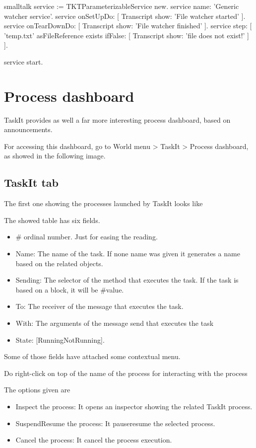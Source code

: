 \documentclass[10pt,twoside,english]{_support/latex/sbabook/sbabook}
\begin{document}
\begin{displaycode}{smalltalk}
service := TKTParameterizableService new.
service name: 'Generic watcher service'.
service onSetUpDo: [ Transcript show: 'File watcher started' ].
service onTearDownDo: [ Transcript show: 'File watcher finished' ].
service step: [
  'temp.txt' asFileReference exists
    ifFalse: [ Transcript show: 'file does not exist!' ] ].

service start.
\end{displaycode}
\chapter{Process dashboard }
TaskIt provides as well a far more interesting process dashboard, based on announcements. 

For accessing this dashboard, go to World menu \textgreater{} TaskIt \textgreater{} Process dashboard, as showed in the following image. 
\section{TaskIt tab }
The first one showing the processes launched by TaskIt looks like 

The showed table has six fields. 

\begin{itemize}
\item \# ordinal number. Just for easing the reading.
\item Name: The name of the task. If none name was given it generates a name based on the related objects. 
\item Sending: The selector of the method that executes the task. If the task is based on a block, it will be \#value. 
\item To: The receiver of the message that executes the task. 
\item With: The arguments of the message send that executes the task
\item State: {[}Running\textbar{}NotRunning{]}.
\end{itemize}

Some of those fields have attached some contextual menu. 

Do right-click on top of the name of the process for interacting with the process

The options given are

\begin{itemize}
\item Inspect the process: It opens an inspector showing the related TaskIt process.
\item Suspend\textbar{}Resume the process: It pause\textbar{}resume the selected process. 
\item Cancel the process: It cancel the process execution.  
\end{itemize}
\end{document}
